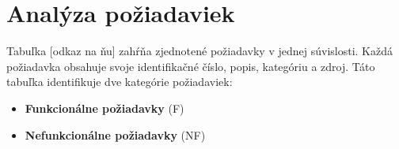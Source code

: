

    

\section{Analýza požiadaviek}
Tabuľka [odkaz na ňu] zahŕňa zjednotené požiadavky v jednej súvislosti. Každá požiadavka obsahuje svoje identifikačné číslo, popis, kategóriu a zdroj. Táto tabuľka identifikuje dve kategórie požiadaviek:
\begin{itemize}
    \item \textbf{Funkcionálne požiadavky} (F)
    \item \textbf{Nefunkcionálne požiadavky} (NF)
\end{itemize}

